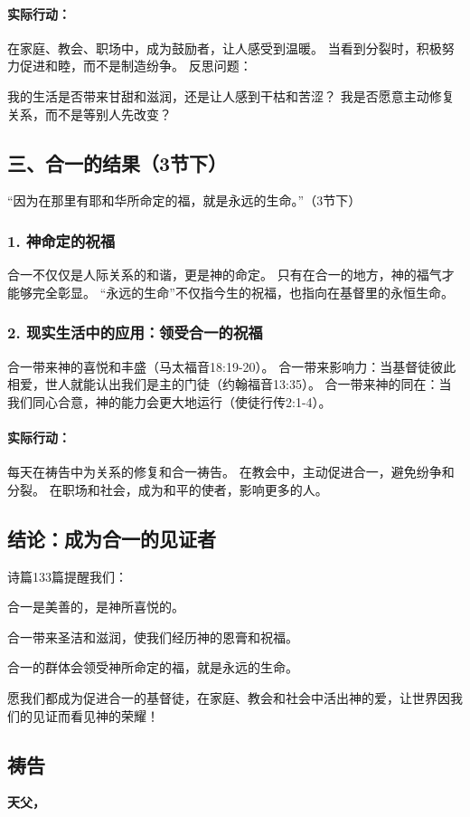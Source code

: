 \documentclass[a4paper, 12pt]{article}
\begin{document}
\paragraph*{实际行动：}

在家庭、教会、职场中，成为鼓励者，让人感受到温暖。
当看到分裂时，积极努力促进和睦，而不是制造纷争。
反思问题：

我的生活是否带来甘甜和滋润，还是让人感到干枯和苦涩？
我是否愿意主动修复关系，而不是等别人先改变？
\subsection*{三、合一的结果（3节下）}
“因为在那里有耶和华所命定的福，就是永远的生命。”（3节下）

\subsubsection*{1. 神命定的祝福}
合一不仅仅是人际关系的和谐，更是神的命定。
只有在合一的地方，神的福气才能够完全彰显。
“永远的生命”不仅指今生的祝福，也指向在基督里的永恒生命。
\subsubsection*{2. 现实生活中的应用：领受合一的祝福}
合一带来神的喜悦和丰盛（马太福音18:19-20）。
合一带来影响力：当基督徒彼此相爱，世人就能认出我们是主的门徒（约翰福音13:35）。
合一带来神的同在：当我们同心合意，神的能力会更大地运行（使徒行传2:1-4）。
\paragraph*{实际行动：}

每天在祷告中为关系的修复和合一祷告。
在教会中，主动促进合一，避免纷争和分裂。
在职场和社会，成为和平的使者，影响更多的人。
\subsection*{结论：成为合一的见证者}
诗篇133篇提醒我们：

合一是美善的，是神所喜悦的。

合一带来圣洁和滋润，使我们经历神的恩膏和祝福。

合一的群体会领受神所命定的福，就是永远的生命。

愿我们都成为促进合一的基督徒，在家庭、教会和社会中活出神的爱，让世界因我们的见证而看见神的荣耀！

\subsection*{祷告}
\textbf{天父，}
\end{document}
